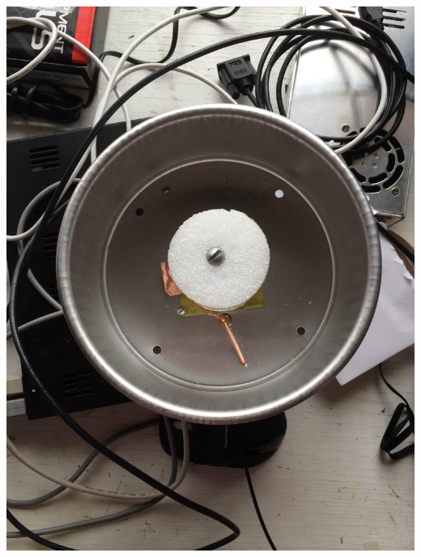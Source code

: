 \documentclass[11pt]{article} %
\begin{document}
\begin{center}
\includegraphics[scale=0.08]{feed/18.jpeg}
\end{center}
\end{document}
